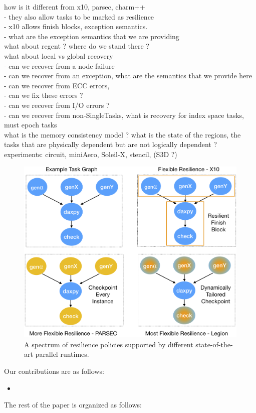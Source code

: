 how is it different from x10, parsec, charm++\\
	- they also allow tasks to be marked as resilience\\
	- x10 allows finish blocks, exception semantics.\\
	- what are the exception semantics that we are providing\\


what about regent ? where do we stand there ?\\

what about local vs global recovery\\
	- can we recover from a node failure\\
	- can we recover from an exception, what are the semantics that we provide
	  here\\
	- can we recover from ECC errors, \\
	- can we fix these errors ?\\
	- can we recover from I/O errors ?\\ 
	- can we recover from non-SingleTasks, what is recovery for index space
	  tasks, must epoch tasks\\

what is the memory consistency model ? what is the state of the regions, the
tasks that are physically dependent but are not logically dependent ?\\
	

experiments: circuit, miniAero, Soleil-X, stencil, (S3D ?)\\

\begin{figure}
\includegraphics[width=.40\textwidth]{images/spectrum_x10_parsec_legion_policies.png}
\caption{A spectrum of resilience policies supported by different state-of-the-art parallel runtimes.}
\end{figure}

Our contributions are as follows:
\begin{itemize}
\item 
\end{itemize}


The rest of the paper is organized as follows:
